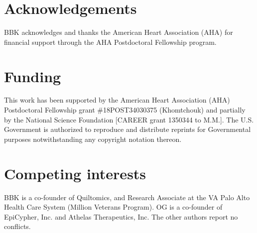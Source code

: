 \documentclass[letter]{bioinfo}
\begin{document}
	\enlargethispage{12pt}
	
	
	
	
	\section*{Acknowledgements}
	
	BBK acknowledges and thanks the American Heart Association (AHA) for financial support through the AHA Postdoctoral Fellowship program.
	\vspace*{-12pt}
	
	\section*{Funding}
	
	This work has been supported by the American Heart Association (AHA) Postdoctoral Fellowship grant \#18POST34030375 (Khomtchouk) and partially by the National Science Foundation [CAREER grant 1350344 to M.M.]. The U.S. Government is authorized to reproduce and distribute reprints for Governmental purposes notwithstanding any copyright notation thereon.\vspace*{-12pt}
	
	\section*{Competing interests}
	
	BBK is a co-founder of Quiltomics, and Research Associate at the VA Palo Alto Health Care System (Million Veterans Program).  OG is a co-founder of EpiCypher, Inc. and Athelas Therapeutics, Inc.  The other authors report no conflicts.\vspace*{-12pt} 
	
	
	
	
	
	
\end{document}
